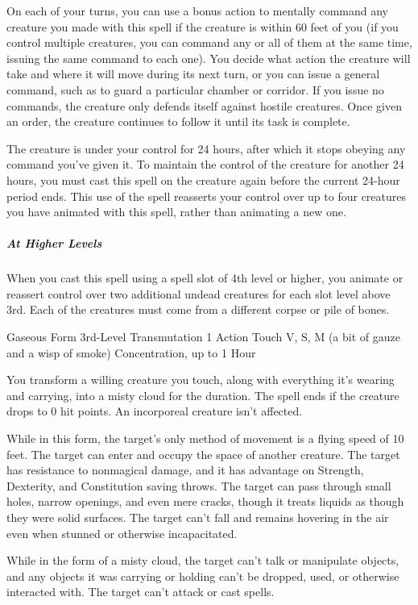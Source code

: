 {On each of your turns, you can use a bonus action to mentally command any creature you made with this spell if the creature is within 60 feet of you (if you control multiple creatures, you can command any or all of them at the same time, issuing the same command to each one). You decide what action the creature will take and where it will move during its next turn, or you can issue a general command, such as to guard a particular chamber or corridor. If you issue no commands, the creature only defends itself against hostile creatures. Once given an order, the creature continues to follow it until its task is complete.

The creature is under your control for 24 hours, after which it stops obeying any command you’ve given it. To maintain the control of the creature for another 24 hours, you must cast this spell on the creature again before the current 24-hour period ends. This use of the spell reasserts your control over up to four creatures you have animated with this spell, rather than animating a new one.

\subparagraph*{At Higher Levels} When you cast this spell using a spell slot of 4th level or higher, you animate or reassert control over two additional undead creatures for each slot level above 3rd. Each of the creatures must come from a different corpse or pile of bones.

\DndSpellHeader
  {Gaseous Form}
  {3rd-Level Transmutation}
  {1 Action}
  {Touch}
  {V, S, M (a bit of gauze and a wisp of smoke)}
  {Concentration, up to 1 Hour}

You transform a willing creature you touch, along with everything it’s wearing and carrying, into a misty cloud for the duration. The spell ends if the creature drops to 0 hit points. An incorporeal creature isn’t affected.

While in this form, the target’s only method of movement is a flying speed of 10 feet. The target can enter and occupy the space of another creature. The target has resistance to nonmagical damage, and it has advantage on Strength, Dexterity, and Constitution saving throws. The target can pass through small holes, narrow openings, and even mere cracks, though it treats liquids as though they were solid surfaces. The target can’t fall and remains hovering in the air even when stunned or otherwise incapacitated.

While in the form of a misty cloud, the target can’t talk or manipulate objects, and any objects it was carrying or holding can’t be dropped, used, or otherwise interacted with. The target can’t attack or cast spells.

}
